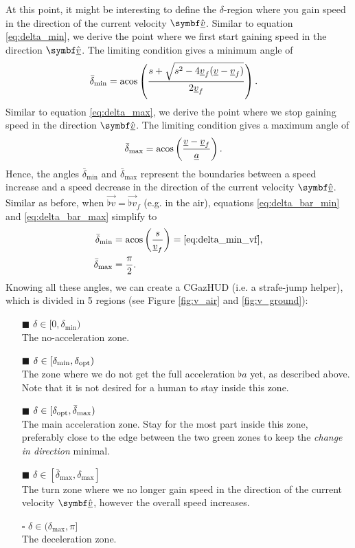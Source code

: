At this point, it might be interesting to define the $\delta$-region where you gain speed in the direction of the current velocity $\uvec{\flat{v}}$. Similar to equation \eqref{eq:delta_min}, we derive the point where we first start gaining speed in the direction $\uvec{\flat{v}}$. The limiting condition gives a minimum angle of
\begin{align}
\label{eq:delta_bar_min}
\bar{\delta}_{\min} &= \acos\left( \frac{s + \sqrt{s^2 - 4 \flat{v}_f (\flat{v} - \flat{v}_f)}}{2 \flat{v}_f} \right).
\end{align}
Similar to equation \eqref{eq:delta_max}, we derive the point where we stop gaining speed in the direction $\uvec{\flat{v}}$. The limiting condition gives a maximum angle of
\begin{align}
\label{eq:delta_bar_max}
\bar{\delta}_{\max} &= \acos\left( \frac{\flat{v} - \flat{v}_f}{\flat{a}} \right).
\end{align}
Hence, the angles $\bar{\delta}_{\min}$ and $\bar{\delta}_{\max}$ represent the boundaries between a speed increase and a speed decrease in the direction of the current velocity $\uvec{\flat{v}}$. Similar as before, when $\vec{\flat{v}} = \vec{\flat{v}}_f$ (e.g. in the air), equations \eqref{eq:delta_bar_min} and \eqref{eq:delta_bar_max} simplify to
\begin{align}
\label{eq:delta_bar_min_vf}
\bar{\delta}_{\min} &= \acos\left( \frac{s}{\flat{v}_f} \right) = \eqref{eq:delta_min_vf},\\
\label{eq:delta_bar_max_vf}
\bar{\delta}_{\max} &= \frac{\pi}{2}.
\end{align}
Knowing all these angles, we can create a CGazHUD (i.e. a strafe-jump helper), which is divided in 5 regions (see Figure \ref{fig:v_air} and \ref{fig:v_ground}):
\begin{itemize}
	\item[\textcolor{cgazgrey!50}{$\blacksquare$}] $\delta \in [0, \delta_{\min})$\\
	The no-acceleration zone.
	\item[\textcolor{cgazgreen!50}{$\blacksquare$}] $\delta \in [\delta_{\min}, \delta_{\operatorname{opt}})$\\
	The zone where we do not get the full acceleration $\flat{a}$ yet, as described above. Note that it is not desired for a human to stay inside this zone.
	\item[\textcolor{cgazdarkgreen!50}{$\blacksquare$}] $\delta \in [\delta_{\operatorname{opt}}, \bar{\delta}_{\max})$\\
	The main acceleration zone. Stay for the most part inside this zone, preferably close to the edge between the two green zones to keep the \emph{change in direction} minimal.
	\item[\textcolor{cgazyellow!50}{$\blacksquare$}] $\delta \in [\bar{\delta}_{\max}, \delta_{\max}]$\\
	The turn zone where we no longer gain speed in the direction of the current velocity $\uvec{\flat{v}}$, however the overall speed increases.
	\item[$\square$] $\delta \in (\delta_{\max}, \pi]$\\
	The deceleration zone.
\end{itemize}

